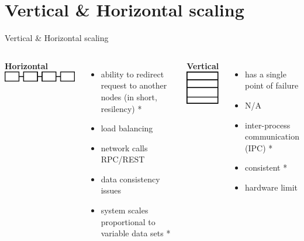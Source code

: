 \documentclass[9pt]{beamer}
\begin{document}
\section{Vertical \& Horizontal scaling}
\begin{frame}{Vertical \& Horizontal scaling}
  \begin{columns}
    \textbf{Horizontal}
    \includegraphics[scale=0.5]{img/hv.png}
    \begin{itemize}
      \item ability to redirect request to another nodes (in short, resilency) *
      \item load balancing
      \item network calls RPC/REST
      \item data consistency issues
      \item system scales proportional to variable data sets *
    \end{itemize}

    \textbf{Vertical}
    \includegraphics[scale=0.5]{img/vertical.png}
    \begin{itemize}
      \item has a single point of failure
      \item N/A
      \item inter-process communication (IPC) *
      \item consistent *
      \item hardware limit
    \end{itemize}
  \end{columns}
\end{frame}

\end{document}
